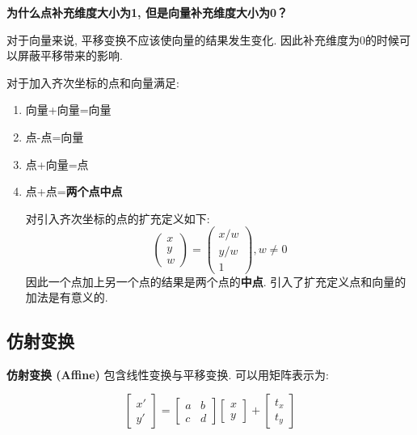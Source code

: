 \begin{question}
	\textbf{为什么点补充维度大小为1, 但是向量补充维度大小为0？}
	
	对于向量来说, 平移变换不应该使向量的结果发生变化. 因此补充维度为0的时候可以屏蔽平移带来的影响. 
	
	对于加入齐次坐标的点和向量满足: 
	\begin{enumerate}
		\item 向量+向量=向量
		\item 点-点=向量
		\item 点+向量=点
		\item 点+点=\textbf{两个点中点}
		
			对引入齐次坐标的点的扩充定义如下: 
			\begin{equation}
				\begin{pmatrix}x\\y\\w\end{pmatrix}=\begin{pmatrix}x/w\\y/w\\1\end{pmatrix},w\ne 0
			\end{equation}
			因此一个点加上另一个点的结果是两个点的\textbf{中点}. 引入了扩充定义点和向量的加法是有意义的. 
	\end{enumerate}
\end{question}

\subsection{仿射变换}

\textbf{仿射变换 (Affine) }包含线性变换与平移变换. 可以用矩阵表示为: 

\begin{equation}
	\begin{bmatrix}x'\\y'\end{bmatrix}=\begin{bmatrix}a&b\\c&d\end{bmatrix}\begin{bmatrix}x\\y\end{bmatrix}+\begin{bmatrix}t_x\\t_y\end{bmatrix}
\end{equation}

